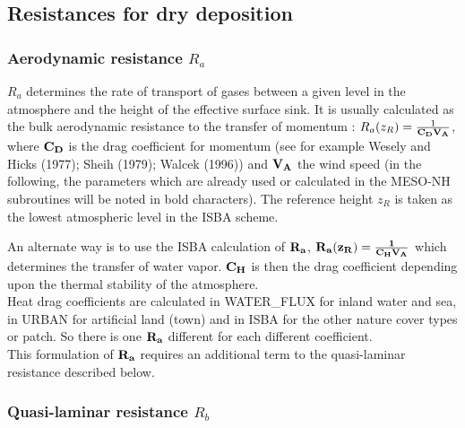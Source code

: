 
\subsection{Resistances for dry deposition}
\subsubsection*{Aerodynamic resistance $R_a$}

$R_a$ determines the rate of transport of gases between a given level in the
atmosphere and the height of the effective surface sink. 
It is usually calculated as the bulk aerodynamic resistance to the transfer of
momentum :  $R_a(z_R)=\frac{1}{\bf{C_D} \bf{V_A}}$, where $\bf{C_D}$ is the drag
coefficient for momentum (see for example Wesely and Hicks (1977); Sheih \etal (1979)\nocite{Sheih1979};
Walcek \etal (1996)\nocite{Walcek1996})
and $\bf{V_A}$ the wind speed (in the following, the parameters which are
already used or calculated in the MESO-NH subroutines will be noted in bold
characters).
The reference height $z_R$ is taken as the lowest atmospheric level in
the ISBA scheme.
\medskip

An alternate way is to use the ISBA calculation of $\bf {R_a}$,
$\bf{R_a(z_R)}=\frac{1}{\bf{C_H} \bf{V_A}}$ 
which determines the transfer of water
vapor. $\bf{C_H}$ is then the drag coefficient depending upon the thermal
stability of the atmosphere.  \\
Heat drag coefficients are calculated in WATER\_FLUX for inland water
and sea, in URBAN for artificial land (town) and in ISBA for the other 
nature cover types or patch. So there is one $\bf {R_a}$ different for
each different coefficient.
\\
This formulation of $\bf {R_a}$ requires an additional term to the
quasi-laminar resistance described below.
\subsubsection*{Quasi-laminar resistance $R_b$}

